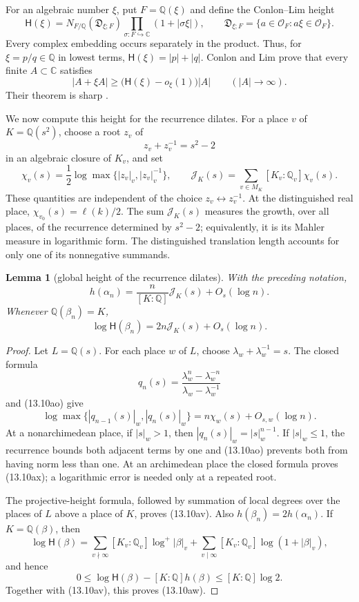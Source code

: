\documentclass[11pt,reqno]{amsart}
\newtheorem{lemma}[theorem]{Lemma}
\theoremstyle{definition}
\theoremstyle{remark}
\newcommand{\C}{\mathbb C}
\newcommand{\Q}{\mathbb Q}
\begin{document}
For an algebraic number \(\xi\), put \(F=\Q(\xi)\) and define the
Conlon--Lim height
\[
 \mathsf H(\xi)=
 N_{F/\Q}(\mathfrak D_{\xi;F})
 \prod_{\sigma:F\hookrightarrow\C}(1+|\sigma\xi|),
 \qquad
 \mathfrak D_{\xi;F}
 =\{a\in\mathcal O_F:a\xi\in\mathcal O_F\}.
\tag{13.10as}
\]
Every complex embedding occurs separately in the product.  Thus, for
\(\xi=p/q\in\Q\) in lowest terms,
\(\mathsf H(\xi)=|p|+|q|\).  Conlon and Lim prove that every finite
\(A\subset\C\) satisfies
\[
 |A+\xi A|\ge
 \bigl(\mathsf H(\xi)-o_\xi(1)\bigr)|A|
 \qquad(|A|\to\infty).
\tag{13.10at}
\]
Their theorem is sharp \cite{ConlonLimAlgebraicDilates}.

We now compute this height for the recurrence dilates.  For a place \(v\)
of \(K=\Q(s^2)\), choose a root \(z_v\) of
\[
 z_v+z_v^{-1}=s^2-2
\]
in an algebraic closure of \(K_v\), and set
\[
 \chi_v(s)=\frac12
 \log\max\{|z_v|_v,|z_v|_v^{-1}\},\qquad
 \mathcal J_K(s)=\sum_{v\in M_K}[K_v:\Q_v]\chi_v(s).
\tag{13.10au}
\]
These quantities are independent of the choice \(z_v\leftrightarrow
z_v^{-1}\).  At the distinguished real place,
\(\chi_{v_0}(s)=\ell(k)/2\).  The sum \(\mathcal J_K(s)\) measures the
growth, over all places, of the recurrence determined by \(s^2-2\);
equivalently, it is its Mahler measure in logarithmic form.  The
distinguished translation length accounts for only one of its nonnegative
summands.

\begin{lemma}[global height of the recurrence dilates]
\label{lem:recurrence-height}
With the preceding notation,
\[
 h(\alpha_n)
 =\frac{n}{[K:\Q]}\mathcal J_K(s)+O_s(\log n).
\tag{13.10av}
\]
Whenever \(\Q(\beta_n)=K\),
\[
 \log\mathsf H(\beta_n)
 =2n\mathcal J_K(s)+O_s(\log n).
\tag{13.10aw}
\]
\end{lemma}

\begin{proof}
Let \(L=\Q(s)\).  For each place \(w\) of \(L\), choose
\(\lambda_w+\lambda_w^{-1}=s\).  The closed formula
\[
 q_n(s)=\frac{\lambda_w^n-\lambda_w^{-n}}
              {\lambda_w-\lambda_w^{-1}}
\]
and (13.10ao) give
\[
 \log\max\{|q_{n-1}(s)|_w,|q_n(s)|_w\}
 =n\chi_w(s)+O_{s,w}(\log n).
\tag{13.10ax}
\]
At a nonarchimedean place, if \(|s|_w>1\), then
\(|q_n(s)|_w=|s|_w^{n-1}\).  If \(|s|_w\le1\), the recurrence bounds both
adjacent terms by one and (13.10ao) prevents both from having norm less
than one.  At an archimedean place the closed formula proves
(13.10ax); a logarithmic error is needed only at a repeated root.

The projective-height formula, followed by summation of local degrees over
the places of \(L\) above a place of \(K\), proves (13.10av).  Also
\(h(\beta_n)=2h(\alpha_n)\).  If \(K=\Q(\beta)\), then
\[
 \log\mathsf H(\beta)
 =\sum_{v\nmid\infty}[K_v:\Q_v]\log^+|\beta|_v
  +\sum_{v\mid\infty}[K_v:\Q_v]\log(1+|\beta|_v),
\]
and hence
\[
 0\le
 \log\mathsf H(\beta)-[K:\Q]h(\beta)
 \le [K:\Q]\log2.
\]
Together with (13.10av), this proves (13.10aw).
\end{proof}
\end{document}
